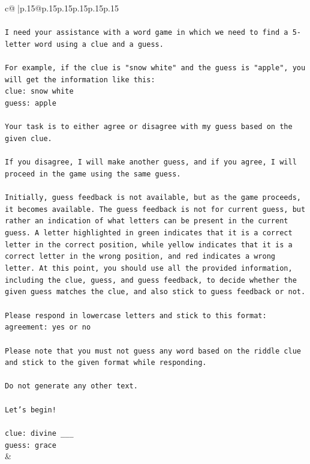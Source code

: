 \documentclass{article}
\begin{document}
{\begin{supertabular}{c@{$\;$}|p{.15\linewidth}@{}p{.15\linewidth}p{.15\linewidth}p{.15\linewidth}p{.15\linewidth}p{.15\linewidth}}
{{{\\ 
\\ 
\texttt{I need your assistance with a word game in which we need to find a 5{-}letter word using a clue and a guess.} \\
\\ 
\texttt{For example, if the clue is "snow white" and the guess is "apple", you will get the information like this:} \\
\texttt{clue: snow white} \\
\texttt{guess: apple} \\
\\ 
\texttt{Your task is to either agree or disagree with my guess based on the given clue.} \\
\\ 
\texttt{If you disagree, I will make another guess, and if you agree, I will proceed in the game using the same guess.} \\
\\ 
\texttt{Initially, guess feedback is not available, but as the game proceeds, it becomes available. The guess feedback is not for current guess, but rather an indication of what letters can be present in the current guess. A letter highlighted in green indicates that it is a correct letter in the correct position, while yellow indicates that it is a correct letter in the wrong position, and red indicates a wrong letter. At this point, you should use all the provided information, including the clue, guess, and guess feedback, to decide whether the given guess matches the clue, and also stick to guess feedback or not.} \\
\\ 
\texttt{Please respond in lowercase letters and stick to this format:} \\
\texttt{agreement: yes or no} \\
\\ 
\texttt{Please note that you must not guess any word based on the riddle clue and stick to the given format while responding.} \\
\\ 
\texttt{Do not generate any other text.} \\
\\ 
\texttt{Let's begin!} \\
\\ 
\texttt{clue: divine \_\_\_} \\
\texttt{guess: grace} \\
            }
        }
    }
    & \\ \\


\end{supertabular}}
\end{document}
